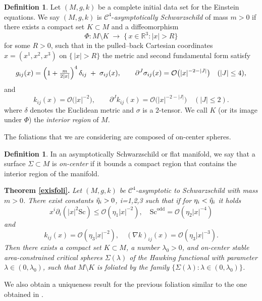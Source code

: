 \documentclass[12pt,a4paper]{amsart}
\theoremstyle{plain}
\theoremstyle{definition}
\newtheorem{definition}[theorem]{Definition}
\newcommand{\R}{\mathbb{R}}
\begin{document}
\begin{definition}\label{asymptoticsc}
Let \((M,g,k)\) be a complete initial data set for the Einstein equations.  We say \((M,g,k)\) is \(\mathcal C^4\)-\emph{asymptotically Schwarzschild} of mass \(m>0\) if there exists a compact set \(K\subset M\) and a diffeomorphism
\[
\Phi: M\setminus K \;\longrightarrow\; \{\,x\in\R^3: |x|>R\}
\]
for some \(R>0\), such that in the pulled–back Cartesian coordinates \(x=(x^1,x^2,x^3)\) on \(\{\,|x|>R\}\) the metric and second fundamental form satisfy
\[
g_{ij}(x)
=\Bigl(1+\tfrac{m}{2|x|}\Bigr)^{4}\,\delta_{ij}
\;+\;\sigma_{ij}(x),
\qquad
\partial^J\sigma_{ij}(x)
=\mathcal{O}\bigl(|x|^{-2-|J|}\bigr)
\quad(|J|\le4),
\]
 and
\[
k_{ij}(x)
=\mathcal{O}\bigl(|x|^{-2}\bigr),
\qquad
\partial^J k_{ij}(x)
=\mathcal{O}\bigl(|x|^{-2-|J|}\bigr)
\quad(|J|\le2).
\]
where $\delta$ denotes the Euclidean metric and $\sigma$ is a $2$-tensor. We call \(K\) (or its image under \(\Phi\)) the \emph{interior region} of \(M\).\end{definition}
The foliations that we are considering are composed of on-center spheres.
\begin{definition}
   In an asymptotically Schwarzschild or  flat manifold, we  say that a surface $\Sigma \subset M $ is \emph{on-center} if it bounds a
compact region that contains the interior region of the manifold. 
\end{definition}
\noindent\textbf{Theorem \ref{exisfoli}.}
   \emph{Let $(M,g,k)$ be $ \mathcal{C}^4$-asymptotic to Schwarzschild with mass $m>0$. There exist constants $ \Tilde{\eta}_i>0$, i=1,2,3 such that if for $\eta_i< \Tilde{\eta}_i $ it holds 
\begin{equation}
    x^i \partial_i (|x|^2 \mathrm{Sc}) \leq \mathcal{O} (\eta_1 |x|^{-2}),\quad  \mathrm{Sc}^{\text{odd}} = \mathcal{O} (\eta_2 |x|^{-4})
\end{equation}
and 
\begin{equation}
k_{ij}(x) = \mathcal{O}(\eta_3 |x|^{-2}) , \quad (\nabla k)_{ij}(x)= \mathcal{O}(\eta_3 |x|^{-3}).
\end{equation}
 Then there exists a compact set \(K \subset M\), a number \(\lambda_0 > 0\),  and on-center stable area-constrained critical
spheres \(\Sigma(\lambda)\) of the Hawking functional  with parameter \(\lambda \in (0, \lambda_0)\), such that \(M \setminus K\) is foliated by the family
\(\{\Sigma(\lambda) : \lambda \in (0, \lambda_0)\}\).}

 We also obtain a uniqueness result for the previous foliation similar to the one obtained in \cite{eichko}.
 
\end{document}
